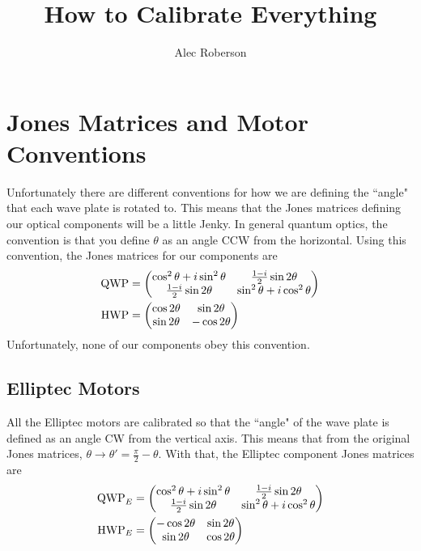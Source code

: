 \documentclass{paper}[11pt]
\title{How to Calibrate Everything}
\author{Alec Roberson}
\begin{document}
	\maketitle
	\tableofcontents
	
	\section{Jones Matrices and Motor Conventions}
	Unfortunately there are different conventions for how we are defining the ``angle" that each wave plate is rotated to. This means that the Jones matrices defining our optical components will be a little Jenky. In general quantum optics, the convention is that you define $\theta$ as an angle CCW from the horizontal. Using this convention, the Jones matrices for our components are
	\begin{align}
		\text{\rmfamily QWP\normalfont} &= \begin{pmatrix}
			\cos^2\theta + i\sin^2\theta & \frac{1-i}{2}\sin2\theta \\
			\frac{1-i}{2}\sin2\theta & \sin^2\theta + i\cos^2\theta
		\end{pmatrix} \\
		\text{\rmfamily HWP\normalfont} &= \begin{pmatrix}
			\cos2\theta & \sin2\theta \\
			\sin2\theta & -\cos2\theta
		\end{pmatrix}
	\end{align}
	Unfortunately, none of our components obey this convention.
	
	\subsection{Elliptec Motors}
	All the Elliptec motors are calibrated so that the ``angle" of the wave plate is defined as an angle CW from the vertical axis. This means that from the original Jones matrices, $\theta\rightarrow\theta'=\frac{\pi}{2}-\theta$. With that, the Elliptec component Jones matrices are
	\begin{align}
		\text{\rmfamily QWP\normalfont}_E &= \begin{pmatrix}
			\cos^2\theta + i\sin^2\theta & \frac{1-i}{2}\sin2\theta \\
			\frac{1-i}{2}\sin2\theta & \sin^2\theta + i\cos^2\theta
		\end{pmatrix} \\
		\text{\rmfamily HWP\normalfont}_E &= \begin{pmatrix} -\cos2\theta & \sin2\theta \\ \sin2\theta & \cos2\theta
		\end{pmatrix}
	\end{align}
	
\end{document}
